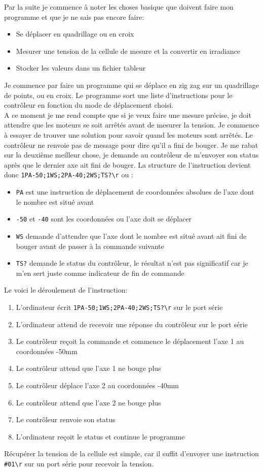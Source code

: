 \documentclass[12pt]{article}
\begin{document}
Par la suite je commence à noter les choses basique que doivent faire mon programme et que je ne sais pas encore faire:
\begin{itemize}
	\item Se déplacer en quadrillage ou en croix
	\item Mesurer une tension de la cellule de mesure et la convertir en irradiance
	\item Stocker les valeurs dans un fichier tableur
\end{itemize}
Je commence par faire un programme qui se déplace en zig zag sur un quadrillage de points, ou en croix.
Le programme sort une liste d'instructions pour le contrôleur en fonction du mode de déplacement choisi.\\
A ce moment je me rend compte que si je veux faire une mesure précise, je doit attendre que les moteurs se soit arrêtés avant de mesurer la tension.
Je commence à essayer de trouver une solution pour savoir quand les moteurs sont arrêtés.
Le contrôleur ne renvoie pas de message pour dire qu'il a fini de bouger.
Je me rabat sur la deuxième meilleur chose, je demande au contrôleur de m'envoyer son status après que le dernier axe ait fini de bouger.
La structure de l'instruction devient donc \verb|1PA-50;1WS;2PA-40;2WS;TS?\r| ou :
\begin{itemize}
	\item \verb|PA| est une instruction de déplacement de coordonnées absolues de l'axe dont le nombre est situé avant
	\item \verb|-50| et \verb|-40| sont les coordonnées ou l'axe doit se déplacer
	\item \verb|WS| demande d'attendre que l'axe dont le nombre est situé avant ait fini de bouger avant de passer à la commande suivante
	\item \verb|TS?| demande le status du contrôleur, le résultat n'est pas significatif car je m'en sert juste comme indicateur de fin de commande
\end{itemize}
Le voici le déroulement de l'instruction:
\begin{enumerate}
	\item L'ordinateur écrit \verb|1PA-50;1WS;2PA-40;2WS;TS?\r| sur le port série
	\item L'ordinateur attend de recevoir une réponse du contrôleur sur le port série
	\item Le contrôleur reçoit la commande et commence le déplacement l'axe 1 au coordonnées -50mm
	\item Le contrôleur attend que l'axe 1 ne bouge plus
	\item Le contrôleur déplace l'axe 2 au coordonnées -40mm
	\item Le contrôleur attend que l'axe 2 ne bouge plus
	\item Le contrôleur renvoie son status
	\item L'ordinateur reçoit le status et continue le programme
\end{enumerate}
Récupérer la tension de la cellule est simple, car il suffit d'envoyer une instruction \verb|#01\r| sur un port série pour recevoir la tension.
\end{document}
